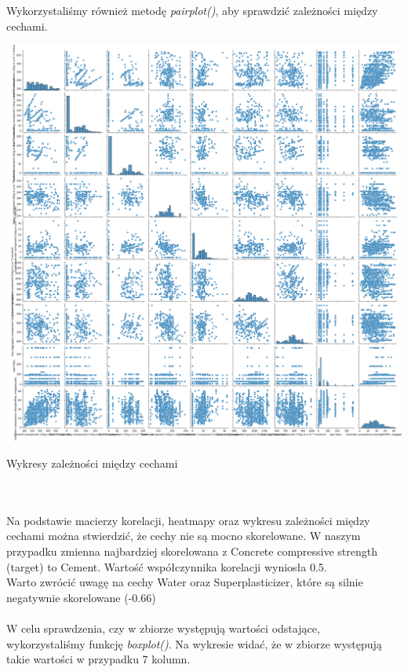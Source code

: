 \documentclass[11pt, a4paper, notitlepage]{report}
\begin{document}
\\ \\
Wykorzystaliśmy również metodę \textit{pairplot()}, aby sprawdzić zależności między cechami.
\\
\begin{center}
	\small
	\includegraphics[width=1\textwidth]{graphics/data_analysis/pairplot}
	\caption{Wykresy zależności między cechami}
\end{center}
\\ \\
Na podstawie macierzy korelacji, heatmapy oraz wykresu zależności między cechami można stwierdzić, że cechy nie są mocno skorelowane.
W naszym przypadku zmienna najbardziej skorelowana z Concrete compressive strength (target) to Cement. Wartość współczynnika korelacji wyniosła 0.5.  \\
Warto zwrócić uwagę na cechy Water oraz Superplasticizer, które są silnie negatywnie skorelowane (-0.66)
\\ \\
W celu sprawdzenia, czy w zbiorze występują wartości odstające, wykorzystaliśmy funkcję \textit{boxplot()}. Na wykresie widać, że w zbiorze występują takie wartości w przypadku 7 kolumn.
\\
\end{document}
